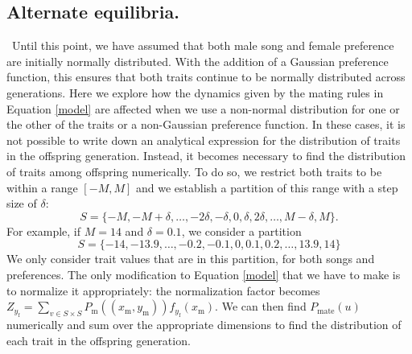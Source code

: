 \documentclass[12pt]{article}
\newcommand{\x}[1]{\text{#1}}
\begin{document}
\subsection*{Alternate equilibria. }
\ Until this point, we have assumed that both male song and female preference are initially normally distributed. With the addition of a Gaussian preference function, this ensures that both traits continue to be normally distributed across generations. Here we explore how the dynamics given by the mating rules in Equation \ref{model} are affected when we use a non-normal distribution for one or the other of the traits or a non-Gaussian preference function. In these cases, it is not possible to write down an analytical expression for the distribution of traits in the offspring generation. Instead, it becomes necessary to find the distribution of traits among offspring numerically. To do so, we restrict both traits to be within a range $[-M,M]$ and we establish a partition of this range with a step size of $\delta$:
$$
S=\{-M,-M+\delta,\dots,-2\delta,-\delta,0,\delta,2\delta,\dots,M-\delta,M\}.$$
For example, if $M=14$ and $\delta=0.1$, we consider a partition $$S=\{-14,-13.9,\dots,-0.2,-0.1,0,0.1,0.2,\dots,13.9,14\}$$
We only consider trait values that are in this partition, for both songs and preferences.
The only modification to Equation \ref{model} that we have to make is to normalize it appropriately: the normalization factor becomes 
$Z_{y_\x{f}}=\sum_{v\in S\times S}P_\x{m}((x_\x{m},y_\x{m}))f_{y_\x{f}}(x_\x{m})$. We can then find $P_\text{mate}(u)$ numerically and sum over the appropriate dimensions to find the distribution of each trait in the offspring generation. 
 
\end{document}
